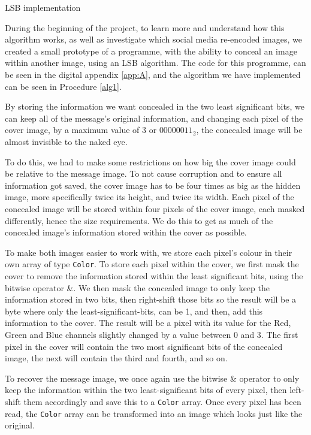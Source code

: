 \begin{experiment}{LSB implementation}

\label{sec:lsb-implementation}
During the beginning of the project, to learn more and understand how this algorithm works, as well as investigate which social media re-encoded images, we created a small prototype of a programme, with the ability to conceal an image within another image, using an LSB algorithm.
The code for this programme, can be seen in the digital appendix \ref{app:A}, and the algorithm we have implemented can be seen in Procedure \ref{alg1}.

By storing the information we want concealed in the two least significant bits, we can keep all of the message's original information, and changing each pixel of the cover image, by a maximum value of 3 or $00000011_2$, the concealed image will be almost invisible to the naked eye.

To do this, we had to make some restrictions on how big the cover image could be relative to the message image. 
To not cause corruption and to ensure all information got saved, the cover image has to be four times as big as the hidden image, more specifically twice its height, and twice its width. 
Each pixel of the concealed image will be stored within four pixels of the cover image, each masked differently, hence the size requirements. 
We do this to get as much of the concealed image's information stored within the cover as possible.

To make both images easier to work with, we store each pixel's colour in their own array of type \lstinline|Color|.
To store each pixel within the cover, we first mask the cover to remove the information stored within the least significant bits, using the bitwise operator \&.
We then mask the concealed image to only keep the information stored in two bits, then right-shift those bits so the result will be a byte where only the least-significant-bits, can be 1, and then, add this information to the cover. 
The result will be a pixel with its value for the Red, Green and Blue channels slightly changed by a value between 0 and 3.
The first pixel in the cover will contain the two most significant bits of the concealed image, the next will contain the third and fourth, and so on. 

To recover the message image, we once again use the bitwise \& operator to only keep the information within the two least-significant bits of every pixel, then left-shift them accordingly and save this to a \lstinline|Color| array. Once every pixel has been read, the \lstinline|Color| array can be transformed into an image which looks just like the original.


\end{experiment}
